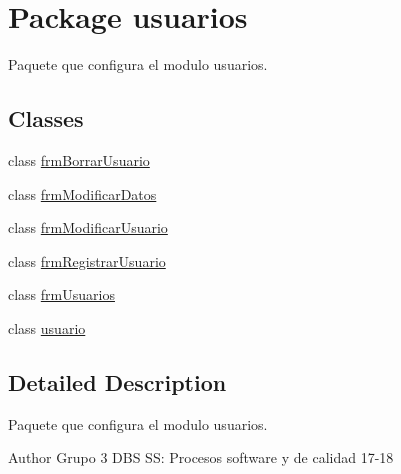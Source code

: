 \hypertarget{namespaceusuarios}{}\section{Package usuarios}
\label{namespaceusuarios}


Paquete que configura el modulo usuarios.  


\subsection*{Classes}
\begin{DoxyCompactItemize}
\item 
class \hyperlink{classusuarios_1_1frm_borrar_usuario}{frm\+Borrar\+Usuario}
\item 
class \hyperlink{classusuarios_1_1frm_modificar_datos}{frm\+Modificar\+Datos}
\item 
class \hyperlink{classusuarios_1_1frm_modificar_usuario}{frm\+Modificar\+Usuario}
\item 
class \hyperlink{classusuarios_1_1frm_registrar_usuario}{frm\+Registrar\+Usuario}
\item 
class \hyperlink{classusuarios_1_1frm_usuarios}{frm\+Usuarios}
\item 
class \hyperlink{classusuarios_1_1usuario}{usuario}
\end{DoxyCompactItemize}


\subsection{Detailed Description}
Paquete que configura el modulo usuarios. 

\begin{DoxyAuthor}{Author}
Grupo 3 D\+BS SS\+: Procesos software y de calidad 17-\/18 
\end{DoxyAuthor}
